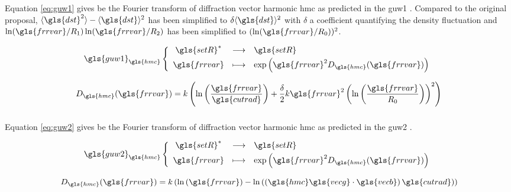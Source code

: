 \subsubsection{}

Equation \eqref{eq:guw1} gives be the Fourier transform of diffraction vector harmonic \gls{hmc} as predicted in the \gls{guw1} \cite{GUW1988} \cite{SGL2001}.
Compared to the original proposal, \( \langle \gls{dst}^2 \rangle - \langle \gls{dst} \rangle^2 \) has been simplified to \( \delta \langle \gls{dst} \rangle^2 \) with \( \delta \) a coefficient quantifying the density fluctuation and \( \ln(\gls{frrvar}/R_1) \ln(\gls{frrvar}/R_2) \) has been simplified to \( (\ln(\gls{frrvar}/R_0))^2 \).

\begin{equation}
  \define{
    \gls{guw1}_{\gls{hmc}}
  }{
    \gls{setR}^*
  }{
    \gls{setR}
  }{
    \gls{frrvar}
  }{
    \exp\left( \gls{frrvar}^2 D_{\gls{hmc}}(\gls{frrvar}) \right)
  }
  \label{eq:guw1}
\end{equation}

\begin{equation}
  D_{\gls{hmc}}(\gls{frrvar}) =
    k \left( \ln \left( \frac{\gls{frrvar}}{\gls{cutrad}} \right) + \frac{\delta}{2} k \gls{frrvar}^2 \left( \ln\left( \frac{\gls{frrvar}}{R_0} \right) \right)^2 \right)
\end{equation}

\subsubsection{}

Equation \eqref{eq:guw2} gives be the Fourier transform of diffraction vector harmonic \gls{hmc} as predicted in the \gls{guw2} \cite{GUW1988}.

\begin{equation}
  \define{
    \gls{guw2}_{\gls{hmc}}
  }{
    \gls{setR}^*
  }{
    \gls{setR}
  }{
    \gls{frrvar}
  }{
    \exp\left( \gls{frrvar}^2 D_{\gls{hmc}}(\gls{frrvar}) \right)
  }
  \label{eq:guw2}
\end{equation}

\begin{equation}
  D_{\gls{hmc}}(\gls{frrvar}) =
    k \left( \ln \left( \gls{frrvar} \right) - \ln\left( \left( \gls{hmc} \gls{vecg} \cdot \gls{vecb} \right) \gls{cutrad} \right) \right)
\end{equation}

\subsubsection{}

